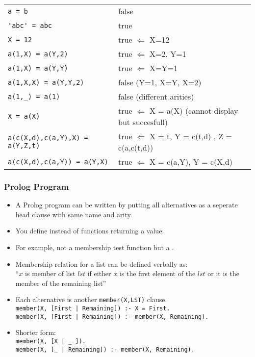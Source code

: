 \begin{frame}[fragile]
\scriptsize
{}
\begin{tabular}{lp{}}\rowcolor{blue!5!white}
\lstinline!a = b!	   & false  \\[1em]
\lstinline!'abc' = abc!	 & true \\[1em]
\lstinline!X = 12!	 & true $\Leftarrow$ X=12 \\[1em]
\lstinline!a(1,X) = a(Y,2)!	 & true $\Leftarrow$ X=2, Y=1 \\[1em]
\lstinline!a(1,X) = a(Y,Y)!	 & true $\Leftarrow$ X=Y=1 \\[1em]
\lstinline!a(1,X,X) = a(Y,Y,2)!	 & false (Y=1, X=Y, X=2) \\[1em]
\lstinline!a(1,_) = a(1)!	 & false (different arities)\\[1em]
\lstinline!X = a(X)!	 & true $\Leftarrow$ X = a(X) (cannot display but succesfull) \\[1em]
\lstinline!a(c(X,d),c(a,Y),X) = a(Y,Z,t)! & true $\Leftarrow$ X = t, Y = c(t,d) , Z = c(a,c(t,d))\\[1em]
\lstinline!a(c(X,d),c(a,Y)) = a(Y,X)! & true $\Leftarrow$ X = c(a,Y), Y = c(X,d)\\[1em]
\end{tabular}

\end{frame}

\begin{frame}
\frametitle{Prolog Program}
\begin{itemize}
\item A Prolog program can be written by putting all alternatives as a seperate
head clause with same name and arity.
\item You define  instead of functions returning a value.
\item For example, not a membership test function but a .
\item Membership relation for a list can be defined verbally as:\\
``$x$ is member of list $lst$ if either $x$ is the first element of the $lst$ or
it is the member of the remaining list''
\item Each alternative is another \lstinline!member(X,LST)! clause.\\
    \lstinline!member(X, [First | Remaining]) :- X = First.!\\
    \lstinline!member(X, [First | Remaining]) :- member(X, Remaining).!\\
\item Shorter form:\\
    \lstinline!member(X, [X | _ ]).!\\
    \lstinline!member(X, [_ | Remaining]) :- member(X, Remaining).!\\
\end{itemize}
\end{frame}

